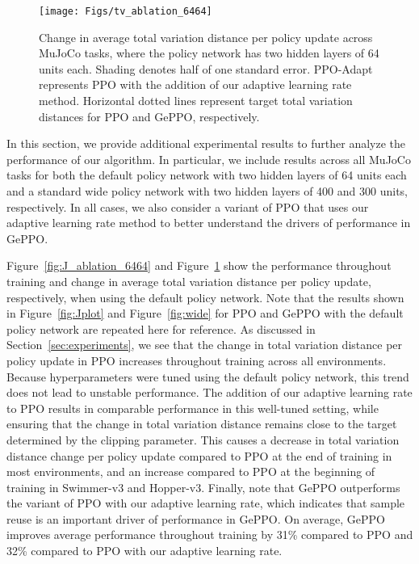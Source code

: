 \documentclass{article}
\begin{document}
\begin{figure}
\centering
\texttt{[image: Figs/tv\_ablation\_6464]}
\caption{Change in average total variation distance per policy update across MuJoCo tasks, where the policy network has two hidden layers of 64 units each. Shading denotes half of one standard error. PPO-Adapt represents PPO with the addition of our adaptive learning rate method. Horizontal dotted lines represent target total variation distances for PPO and GePPO, respectively.}\label{fig:tv_ablation_6464}
\end{figure}

In this section, we provide additional experimental results to further analyze the performance of our algorithm. In particular, we include results across all MuJoCo tasks for both the default policy network with two hidden layers of 64 units each and a standard wide policy network with two hidden layers of 400 and 300 units, respectively. In all cases, we also consider a variant of PPO that uses our adaptive learning rate method to better understand the drivers of performance in GePPO.

Figure~\ref{fig:J_ablation_6464} and Figure~\ref{fig:tv_ablation_6464} show the performance throughout training and change in average total variation distance per policy update, respectively, when using the default policy network. Note that the results shown in Figure~\ref{fig:Jplot} and Figure~\ref{fig:wide} for PPO and GePPO with the default policy network are repeated here for reference. As discussed in Section~\ref{sec:experiments}, we see that the change in total variation distance per policy update in PPO increases throughout training across all environments. Because hyperparameters were tuned using the default policy network, this trend does not lead to unstable performance. The addition of our adaptive learning rate to PPO results in comparable performance in this well-tuned setting, while ensuring that the change in total variation distance remains close to the target determined by the clipping parameter. This causes a decrease in total variation distance change per policy update compared to PPO at the end of training in most environments, and an increase compared to PPO at the beginning of training in Swimmer-v3 and Hopper-v3. Finally, note that GePPO outperforms the variant of PPO with our adaptive learning rate, which indicates that sample reuse is an important driver of performance in GePPO. On average, GePPO improves average performance throughout training by 31\% compared to PPO and 32\% compared to PPO with our adaptive learning rate.
\end{document}

